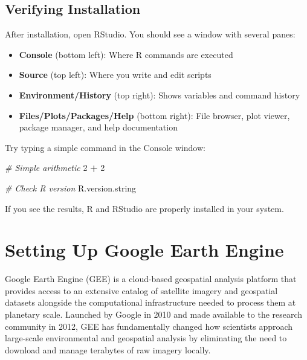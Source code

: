 \documentclass[
  10pt,
  b5paper,
  oneside]{book}
\newenvironment{Shaded}{\begin{snugshade}}{\end{snugshade}}
\newcommand{\CommentTok}[1]{\textcolor[rgb]{0.56,0.35,0.01}{\textit{#1}}}
\newcommand{\DecValTok}[1]{\textcolor[rgb]{0.00,0.00,0.81}{#1}}
\newcommand{\NormalTok}[1]{#1}
\newcommand{\SpecialCharTok}[1]{\textcolor[rgb]{0.81,0.36,0.00}{\textbf{#1}}}
\begin{document}
\subsection{Verifying Installation}\label{verifying-installation}

After installation, open RStudio. You should see a window with several panes:

\begin{itemize}
\item
  \textbf{Console} (bottom left): Where R commands are executed
\item
  \textbf{Source} (top left): Where you write and edit scripts
\item
  \textbf{Environment/History} (top right): Shows variables and command history
\item
  \textbf{Files/Plots/Packages/Help} (bottom right): File browser, plot viewer, package manager, and help documentation
\end{itemize}

Try typing a simple command in the Console window:

\begin{Shaded}
\begin{Highlighting}[]
\CommentTok{\# Simple arithmetic}
\DecValTok{2} \SpecialCharTok{+} \DecValTok{2}

\CommentTok{\# Check R version}
\NormalTok{R.version.string}
\end{Highlighting}
\end{Shaded}

If you see the results, R and RStudio are properly installed in your system.

\section*{Setting Up Google Earth Engine}\label{setting-up-google-earth-engine}

Google Earth Engine (GEE) is a cloud-based geospatial analysis platform that provides access to an extensive catalog of satellite imagery and geospatial datasets alongside the computational infrastructure needed to process them at planetary scale. Launched by Google in 2010 and made available to the research community in 2012, GEE has fundamentally changed how scientists approach large-scale environmental and geospatial analysis by eliminating the need to download and manage terabytes of raw imagery locally.
\end{document}
